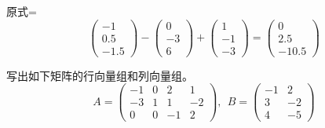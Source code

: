\documentclass[a4paper]{report}
\begin{document}
\begin{jie}
原式=
\begin{equation*}
\begin{pmatrix}
-1\\ 0.5\\ -1.5
\end{pmatrix}-
\begin{pmatrix}
0\\ -3\\ 6
\end{pmatrix}+
\begin{pmatrix}
1\\ -1\\ -3
\end{pmatrix}=\begin{pmatrix}
0\\ 2.5\\ -10.5
\end{pmatrix}
\end{equation*}
\end{jie}

\EX 写出如下矩阵的行向量组和列向量组。
\begin{equation*}
A=
\begin{pmatrix}
-1 &0&2&1\\ -3& 1&1&-2\\ 0&0&-1&2
\end{pmatrix},~~B=
\begin{pmatrix}
-1&2\\ 3&-2\\ 4&-5
\end{pmatrix}
\end{equation*}
\end{document}
